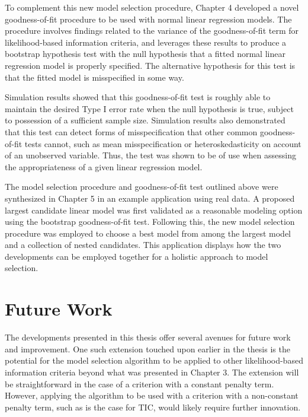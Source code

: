 		To complement this new model selection procedure, Chapter 4 developed a novel goodness-of-fit procedure to be used with normal linear regression models.
		The procedure involves findings related to the variance of the goodness-of-fit term for likelihood-based information criteria, and leverages these
		results to produce a bootstrap hypothesis test with the null hypothesis that a fitted normal linear regression model is properly specified. The alternative
		hypothesis for this test is that the fitted model is misspecified in some way.

		Simulation results showed that this goodness-of-fit test is roughly able to maintain the desired Type I error rate when the null hypothesis is true, subject
		to possession of a sufficient sample size. Simulation results also demonstrated that this test can detect forms of misspecification that other common
		goodness-of-fit tests cannot, such as mean misspecification or heteroskedasticity on account of an unobserved variable. Thus, the test was shown to be of use
		when assessing the appropriateness of a given linear regression model.

		The model selection procedure and goodness-of-fit test outlined above were synthesized in Chapter 5 in an example application using real data. A proposed
		largest candidate linear model was first validated as a reasonable modeling option using the bootstrap goodness-of-fit test. Following this, the new model selection
		procedure was employed to choose a best model from among the largest model and a collection of nested candidates. This application displays how the
		two developments can be employed together for a holistic approach to model selection.

		\section{Future Work}

		The developments presented in this thesis offer several avenues for future work and improvement. One such extension touched upon earlier in the thesis is the
		potential for the model selection algorithm to be applied to other likelihood-based information criteria beyond what was presented in Chapter 3. The extension
		will be straightforward in the case of a criterion with a constant penalty term. However, applying the algorithm to be used with a criterion with a non-constant penalty term,
		such as is the case for TIC, would likely require further innovation.

